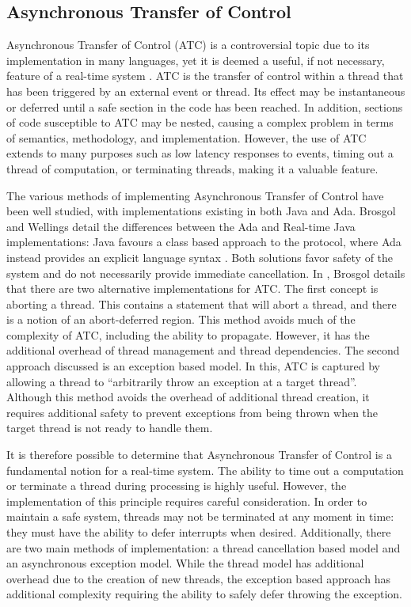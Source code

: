 \subsection{Asynchronous Transfer of Control}
Asynchronous Transfer of Control (ATC) is a controversial topic due to
its implementation in many languages, yet it is deemed a useful, if not
necessary, feature of a real-time system \cite{atc-article}.  ATC is the
transfer of control within a thread that has been triggered by an external
event or thread.  Its effect may be instantaneous or deferred until a safe
section in the code has been reached. In addition, sections of code susceptible
to ATC may be nested, causing a complex problem in terms of semantics,
methodology, and implementation.  However, the use of ATC extends to many
purposes such as low latency responses to events, timing out a thread of
computation, or terminating threads, making it a valuable feature. 
\par\bigskip\noindent
The various methods of implementing Asynchronous Transfer
of Control have been well studied, with implementations existing in both Java
and Ada. Brosgol and Wellings detail the differences between the Ada and
Real-time Java implementations: Java favours a class based approach to
the protocol, where Ada instead provides an explicit language syntax
\cite{atc-article}. Both solutions favor safety of the system and do not
necessarily provide immediate cancellation. In \cite{Brosgol:2002:ATC}, Brosgol
details that there are two alternative implementations for ATC. The first
concept is aborting a thread. This contains a statement that will abort a
thread, and there is a notion of an abort-deferred region. 
This method avoids much of the complexity of ATC, including the ability to
propagate.
However, it has the additional overhead of thread management and
thread dependencies.  The second approach discussed is an exception based
model. In this, ATC is captured by allowing a thread to ``arbitrarily throw an
exception at a target thread''.  Although this method avoids the overhead of additional
thread creation, it requires additional safety to prevent exceptions
from being thrown when the target thread is not ready to handle them.
\par\bigskip\noindent
It is therefore possible to determine that Asynchronous
Transfer of Control is a fundamental notion for a real-time system. The ability
to time out a computation or terminate a thread during processing is highly
useful. However, the implementation of this principle requires careful
consideration. In order to maintain a safe system, threads may not be
terminated at any moment in time: they must have the ability to defer
interrupts when desired. Additionally, there are two main methods of
implementation: a thread cancellation based model and an asynchronous
exception model. While the thread model has additional overhead due to the
creation of new threads, the exception based approach has additional complexity
requiring the ability to safely defer throwing the exception. 


